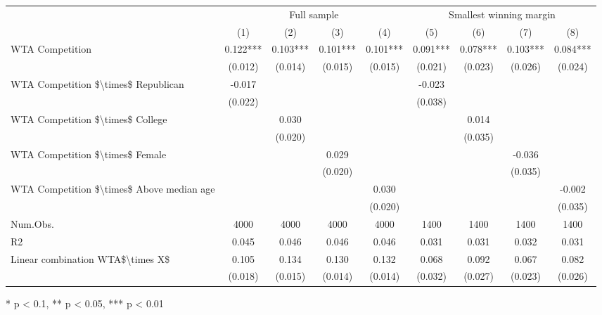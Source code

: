 \begin{table}[t]
\fontsize{12.0pt}{14.4pt}\selectfont
\begin{tabular*}{\linewidth}{@{\extracolsep{\fill}}lcccccccc}
\toprule
 & \multicolumn{4}{c}{Full sample} & \multicolumn{4}{c}{Smallest winning margin} \\ 
\cmidrule(lr){2-5} \cmidrule(lr){6-9}
  & (1) & (2) & (3) & (4) & (5) & (6) & (7) & (8) \\ 
\midrule\addlinespace[2.5pt]
WTA Competition & 0.122*** & 0.103*** & 0.101*** & 0.101*** & 0.091*** & 0.078*** & 0.103*** & 0.084*** \\ 
 & (0.012) & (0.014) & (0.015) & (0.015) & (0.021) & (0.023) & (0.026) & (0.024) \\ 
WTA Competition \$\textbackslash{}times\$ Republican & -0.017 &  &  &  & -0.023 &  &  &  \\ 
 & (0.022) &  &  &  & (0.038) &  &  &  \\ 
WTA Competition \$\textbackslash{}times\$ College &  & 0.030 &  &  &  & 0.014 &  &  \\ 
 &  & (0.020) &  &  &  & (0.035) &  &  \\ 
WTA Competition \$\textbackslash{}times\$ Female &  &  & 0.029 &  &  &  & -0.036 &  \\ 
 &  &  & (0.020) &  &  &  & (0.035) &  \\ 
WTA Competition \$\textbackslash{}times\$ Above median age &  &  &  & 0.030 &  &  &  & -0.002 \\ 
{} & {} & {} & {} & {(0.020)} & {} & {} & {} & {(0.035)} \\ 
Num.Obs. & 4000 & 4000 & 4000 & 4000 & 1400 & 1400 & 1400 & 1400 \\ 
R2 & 0.045 & 0.046 & 0.046 & 0.046 & 0.031 & 0.031 & 0.032 & 0.031 \\ 
Linear combination WTA\$\textbackslash{}times X\$ & 0.105 & 0.134 & 0.130 & 0.132 & 0.068 & 0.092 & 0.067 & 0.082 \\ 
 & (0.018) & (0.015) & (0.014) & (0.014) & (0.032) & (0.027) & (0.023) & (0.026) \\ 
\bottomrule
\end{tabular*}
\begin{minipage}{\linewidth}
* p < 0.1, ** p < 0.05, *** p < 0.01\\
\end{minipage}
\end{table}

